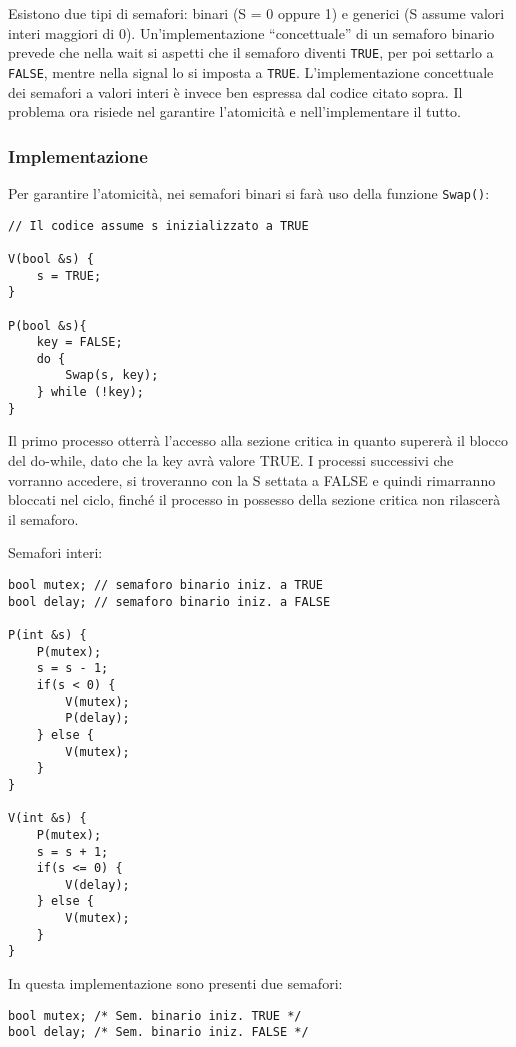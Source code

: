 \documentclass[a4paper]{article}
\begin{document}
Esistono due tipi di semafori: binari (S = 0 oppure 1) e generici (S assume valori interi maggiori di 0). Un'implementazione ``concettuale'' di un semaforo binario prevede che nella wait si aspetti che il semaforo diventi \texttt{TRUE}, per poi settarlo a \texttt{FALSE}, mentre nella signal lo si imposta a \texttt{TRUE}. L'implementazione concettuale dei semafori a valori interi è invece ben espressa dal codice citato sopra. \newline
Il problema ora risiede nel garantire l'atomicità e nell'implementare il tutto.

\subsubsection{Implementazione}
Per garantire l'atomicità, nei semafori binari si farà uso della funzione \texttt{Swap()}:
\begin{verbatim}
// Il codice assume s inizializzato a TRUE

V(bool &s) {
    s = TRUE;
} 

P(bool &s){                                            
    key = FALSE;
    do {                                                       
        Swap(s, key);
    } while (!key);
}
\end{verbatim}
Il primo processo otterrà l'accesso alla sezione critica in quanto supererà il blocco del do-while, dato che la key avrà valore TRUE. I processi successivi che vorranno accedere, si troveranno con la S settata a FALSE e quindi rimarranno bloccati nel ciclo, finché il processo in possesso della sezione critica non rilascerà il semaforo.

Semafori interi:
\begin{verbatim}
bool mutex; // semaforo binario iniz. a TRUE
bool delay; // semaforo binario iniz. a FALSE

P(int &s) {
    P(mutex);
    s = s - 1;
    if(s < 0) {
        V(mutex);
        P(delay);
    } else {
        V(mutex);
    }
}

V(int &s) {
    P(mutex);
    s = s + 1;
    if(s <= 0) {
        V(delay);
    } else {
        V(mutex);
    }
}
\end{verbatim}

In questa implementazione sono presenti due semafori:

\begin{verbatim}
bool mutex; /* Sem. binario iniz. TRUE */
bool delay; /* Sem. binario iniz. FALSE */
\end{verbatim}
\end{document}
